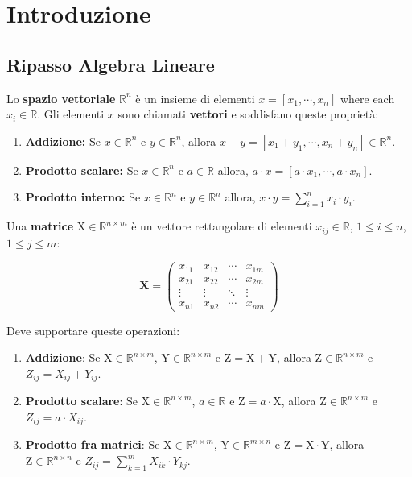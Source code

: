 \chapter{Introduzione}

\section{Ripasso Algebra Lineare}
\begin{defn}
  Lo \textbf{spazio vettoriale} $\mathbb{R}^n$ è un insieme di elementi $x = [x_1, \cdots, x_n]$ where each $x_i \in \mathbb{R}$.  
  Gli elementi $x$ sono chiamati \textbf{vettori} e soddisfano queste proprietà:
  \begin{enumerate}
    \item \textbf{Addizione:} Se $x \in \mathbb{R}^n$ e $y \in \mathbb{R}^n$, allora $x + y = [x_1+y_1, \cdots, x_n+y_n] \in \mathbb{R}^n$. 
    \item \textbf{Prodotto scalare:} Se $x \in \mathbb{R}^n$ e $a \in \mathbb{R}$ allora, $a \cdot x = [a\cdot x_1, \cdots, a\cdot x_n]$.
    \item \textbf{Prodotto interno:} Se $x \in \mathbb{R}^n$ e $y \in \mathbb{R}^n$ allora, $x \cdot y = \sum^n_{i=1}{x_i \cdot y_i}$.
  \end{enumerate}
\end{defn}

\begin{defn}[Matrice]
  Una \textbf{matrice} $\text{X} \in \mathbb{R}^{n \times m}$ è un vettore rettangolare di elementi $x_{ij} \in \mathbb{R}$, $1 \le i \le n$, $1 \le j \le m$:

  \[\mathbf{X} = \begin{pmatrix}
    x_{11} & x_{12} & \cdots & x_{1m} \\
    x_{21} & x_{22} & \cdots & x_{2m} \\
    \vdots & \vdots & \ddots & \vdots \\
    x_{n1} & x_{n2} & \cdots & x_{nm}
  \end{pmatrix}\]

  Deve supportare queste operazioni:
  \begin{enumerate}
    \item \textbf{Addizione}: Se $\text{X} \in \mathbb{R}^{n \times m}$, $\text{Y} \in \mathbb{R}^{n \times m}$ e $\text{Z} = \text{X} + \text{Y}$, allora $\text{Z} \in \mathbb{R}^{n \times m}$ e $Z_{ij} = X_{ij} + Y_{ij}$.
    \item \textbf{Prodotto scalare}: Se $\text{X} \in \mathbb{R}^{n \times m}$, $a \in \mathbb{R}$ e $\text{Z} = a \cdot \text{X}$, allora $\text{Z} \in \mathbb{R}^{n \times m}$ e $Z_{ij} = a \cdot X_{ij}$.
    \item \textbf{Prodotto fra matrici}: Se $\text{X} \in \mathbb{R}^{n \times m}$, $\text{Y} \in \mathbb{R}^{m \times n}$ e $\text{Z} = \text{X} \cdot \text{Y}$, allora $\text{Z} \in \mathbb{R}^{n \times n}$ e $Z_{ij} = \sum_{k=1}^{m} X_{ik} \cdot Y_{kj}$.
  \end{enumerate}
\end{defn}

